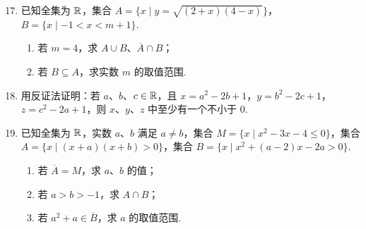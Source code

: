 \documentclass[a4paper,11pt]{article}
\begin{document}

\begin{enumerate}
\setcounter{enumi}{16}

\item 已知全集为 $\mathbb{R}$，集合 $A=\{x\mid y=\sqrt{(2+x)(4-x)}\}$，$B=\{x\mid-1<x<m+1\}$.

\begin{enumerate}[label=(\arabic*)]
\item 若 $m=4$，求 $A\cup B$、$\overline A\cap B$；
\item 若 $B\subseteq A$，求实数 $m$ 的取值范围.
\end{enumerate}

\ifanswer
\solbegin
{}
\step{所以 $A\cup B=[-2,5)$，$\overline A=\{x\mid x<-2\text{ 或 }x>4\}$，$\overline A\cap B=(4,5)$.}
\step{综上，$m\leqslant3$，所以实数 $m$ 的取值范围是 $(-\infty,3]$.}
\solend
\fi

\ansspace[6]

\item 用反证法证明：若 $a$、$b$、$c\in\mathbb{R}$，且 $x=a^2-2b+1$，$y=b^2-2c+1$，$z=c^2-2a+1$，则 $x$、$y$、$z$ 中至少有一个不小于 $0$.

\ifanswer
\solbegin
{}
\solend
\fi

\ansspace[5]

\item 已知全集为 $\mathbb{R}$，实数 $a$、$b$ 满足 $a\neq b$，集合 $M=\{x\mid x^2-3x-4\leqslant0\}$，集合 $A=\{x\mid(x+a)(x+b)>0\}$，集合 $B=\{x\mid x^2+(a-2)x-2a>0\}$.

\begin{enumerate}[label=(\arabic*)]
\item 若 $\overline A=M$，求 $a$、$b$ 的值；
\item 若 $a>b>-1$，求 $A\cap B$；
\item 若 $a^2+a\in\overline B$，求 $a$ 的取值范围.
\end{enumerate}


\end{enumerate}
\end{document}
